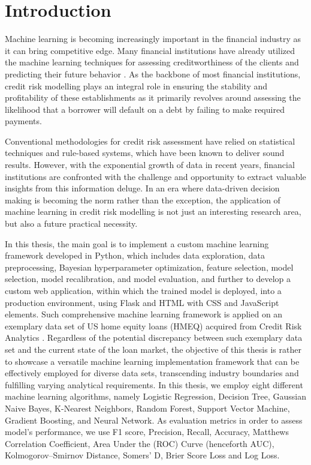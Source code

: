 \chapter{Introduction}
\label{chap:one}


Machine learning is becoming increasingly important in the financial industry as it can bring competitive edge. Many financial institutions have already utilized the machine learning techniques for assessing creditworthiness of the clients and predicting their future behavior \citep{PwC2023}.
As the backbone of most financial institutions, credit risk modelling plays an integral role in ensuring the stability and profitability of these establishments as it primarily revolves around assessing the likelihood that a borrower will default on a debt by failing to make required payments.

Conventional methodologies for credit risk assessment have relied on statistical techniques and rule-based systems, which have been known to deliver sound results.
However, with the exponential growth of data in recent years, financial institutions are confronted with the challenge and opportunity to extract valuable insights from this information deluge.
In an era where data-driven decision making is becoming the norm rather than the exception, the application of machine learning in credit risk modelling is not just an interesting research area, but also a future practical necessity.

In this thesis, the main goal is to implement a custom machine learning framework developed in Python, which includes data exploration, data preprocessing, Bayesian hyperparameter optimization, feature selection, model selection, model recalibration, and model evaluation, and further to develop a custom web application, within which the trained model is deployed, into a production environment, using Flask and HTML with CSS and JavaScript elements.
Such comprehensive machine learning framework is applied on an exemplary data set of US home equity loans (HMEQ) acquired from Credit Risk Analytics \citep{baesens2016credit}.
Regardless of the potential discrepancy between such exemplary data set and the current state of the loan market, the objective of this thesis is rather to showcase a versatile machine learning implementation framework that can be effectively employed for diverse data sets, transcending industry boundaries and fulfilling varying analytical requirements.
In this thesis, we employ eight different machine learning algorithms, namely Logistic Regression, Decision Tree, Gaussian Naive Bayes, K-Nearest Neighbors, Random Forest, Support Vector Machine, Gradient Boosting, and Neural Network.
As evaluation metrics in order to assess model's performance, we use F1 score, Precision, Recall, Accuracy, Matthews Correlation Coefficient, Area Under the (ROC) Curve (henceforth AUC), Kolmogorov--Smirnov Distance, Somers' D, Brier Score Loss and Log Loss.

